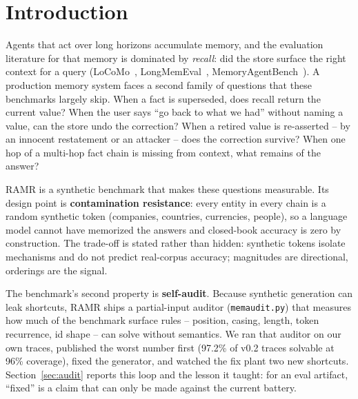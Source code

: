 \documentclass[11pt]{article}
\begin{document}
\section{Introduction}

Agents that act over long horizons accumulate memory, and the evaluation literature for that memory is
dominated by \emph{recall}: did the store surface the right context for a query
(LoCoMo~\cite{locomo}, LongMemEval~\cite{longmemeval}, MemoryAgentBench~\cite{memoryagentbench}). A
production memory system faces a second family of questions that these benchmarks largely skip. When a
fact is superseded, does recall return the current value? When the user says ``go back to what we had''
without naming a value, can the store undo the correction? When a retired value is re-asserted -- by an
innocent restatement or an attacker -- does the correction survive? When one hop of a multi-hop fact
chain is missing from context, what remains of the answer?

RAMR is a synthetic benchmark that makes these questions measurable. Its design point is
\textbf{contamination resistance}: every entity in every chain is a random synthetic token (companies,
countries, currencies, people), so a language model cannot have memorized the answers and closed-book
accuracy is zero by construction. The trade-off is stated rather than hidden: synthetic tokens isolate
mechanisms and do not predict real-corpus accuracy; magnitudes are directional, orderings are the
signal.

The benchmark's second property is \textbf{self-audit}. Because synthetic generation can leak shortcuts,
RAMR ships a partial-input auditor (\texttt{memaudit.py}) that measures how much of the benchmark
surface rules -- position, casing, length, token recurrence, id shape -- can solve without semantics.
We ran that auditor on our own traces, published the worst number first (97.2\% of v0.2 traces solvable
at 96\% coverage), fixed the generator, and watched the fix plant two new shortcuts. Section~\ref{sec:audit}
reports this loop and the lesson it taught: for an eval artifact, ``fixed'' is a claim that can only be
made against the current battery.
\end{document}
